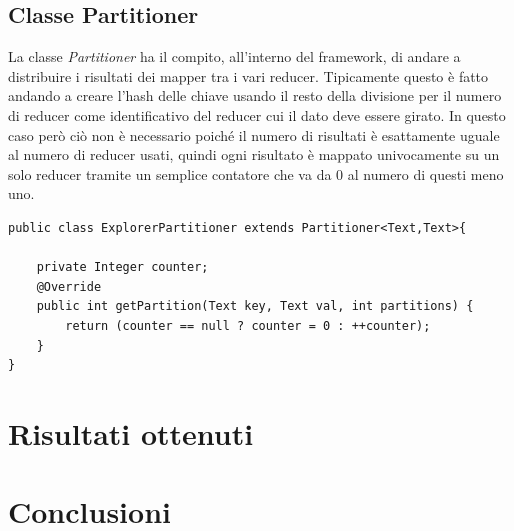 \documentclass[]{IEEEtran}
\begin{document}
\subsection{Classe Partitioner}
La classe \emph{Partitioner} ha il compito, all'interno del framework, di andare a distribuire i risultati dei mapper tra i vari reducer. Tipicamente questo è fatto andando a creare l'hash delle chiave usando il resto della divisione per il numero di reducer come identificativo del reducer cui il dato deve essere girato. In questo caso però ciò non è necessario poiché il numero di risultati è esattamente uguale al numero di reducer usati, quindi ogni risultato è mappato univocamente su un solo reducer tramite un semplice contatore che va da 0 al numero di questi meno uno.
\begin{lstlisting}[style=javaStyle]
public class ExplorerPartitioner extends Partitioner<Text,Text>{

	private Integer counter;
	@Override
	public int getPartition(Text key, Text val, int partitions) {
		return (counter == null ? counter = 0 : ++counter);
	}
}
\end{lstlisting}

\section{Risultati ottenuti}
\section{Conclusioni}



\end{document}
